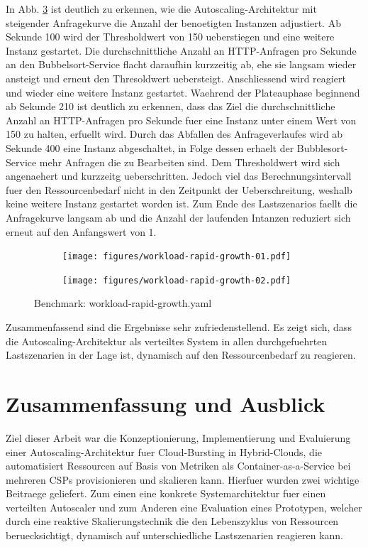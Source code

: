 \documentclass[runningheads]{llncs}
\begin{document}
In Abb. \ref{fig:benchmark_04} ist deutlich zu erkennen, wie die Autoscaling-Architektur mit steigender Anfragekurve die Anzahl der benoetigten Instanzen adjustiert. Ab Sekunde 100 wird der Thresholdwert von 150 ueberstiegen und eine weitere Instanz gestartet. Die durchschnittliche Anzahl an HTTP-Anfragen pro Sekunde an den Bubbelsort-Service flacht daraufhin kurzzeitig ab, ehe sie langsam wieder ansteigt und erneut den Thresoldwert uebersteigt. Anschliessend wird reagiert und wieder eine weitere Instanz gestartet. Waehrend der Plateauphase beginnend ab Sekunde 210 ist deutlich zu erkennen, dass das Ziel die durchschnittliche Anzahl an HTTP-Anfragen pro Sekunde fuer eine Instanz unter einem Wert von 150 zu halten, erfuellt wird. Durch das Abfallen des Anfrageverlaufes wird ab Sekunde 400 eine Instanz abgeschaltet, in Folge dessen erhaelt der Bubblesort-Service mehr Anfragen die zu Bearbeiten sind. Dem Thresholdwert wird sich angenaehert und kurzzeitg ueberschritten. Jedoch viel das Berechnungsintervall fuer den Ressourcenbedarf nicht in den Zeitpunkt der Ueberschreitung, weshalb keine weitere Instanz gestartet worden ist. Zum Ende des Lastszenarios faellt die Anfragekurve langsam ab und die Anzahl der laufenden Intanzen reduziert sich erneut auf den Anfangswert von 1. \\

\begin{figure}
	\centering
	\begin{subfigure}{.5\textwidth}
		\centering
		\texttt{[image: figures/workload-rapid-growth-01.pdf]}
		\label{fig:sub1}
	\end{subfigure}%
	\begin{subfigure}{.5\textwidth}
		\centering
		\texttt{[image: figures/workload-rapid-growth-02.pdf]}
		\label{fig:sub2}
	\end{subfigure}
	\caption{Benchmark: workload-rapid-growth.yaml}
	\label{fig:benchmark_04}
\end{figure}

Zusammenfassend sind die Ergebnisse sehr zufriedenstellend. Es zeigt sich, dass die Autoscaling-Architektur als verteiltes System in allen durchgefuehrten Lastszenarien in der Lage ist, dynamisch auf den Ressourcenbedarf zu reagieren.

\section{Zusammenfassung und Ausblick}

Ziel dieser Arbeit war die Konzeptionierung, Implementierung und Evaluierung einer Autoscaling-Architektur fuer Cloud-Bursting in Hybrid-Clouds, die automatisiert Ressourcen auf Basis von Metriken als Container-as-a-Service bei mehreren CSPs provisionieren und skalieren kann. Hierfuer wurden zwei wichtige Beitraege geliefert. Zum einen eine konkrete Systemarchitektur fuer einen verteilten Autoscaler und zum Anderen eine Evaluation eines Prototypen, welcher durch eine reaktive Skalierungstechnik die den Lebenszyklus von Ressourcen beruecksichtigt, dynamisch auf unterschiedliche Lastszenarien reagieren kann. \\
\end{document}
